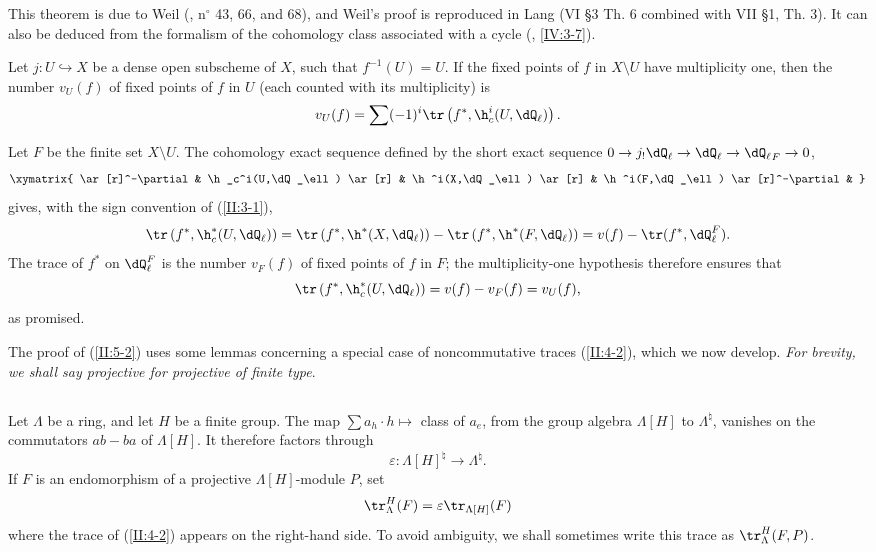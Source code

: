 This theorem is due to Weil (\cite{we48}, n$^\circ$ 43, 66, and 68), and Weil's
proof is reproduced in Lang \cite{la83} (VI \S3 Th. 6 combined with VII \S1,
Th. 3). It can also be deduced from the formalism of the cohomology class
associated with a cycle (, \ref{IV:3-7}).






\begin{corollary_}\label{II:5-4}
Let $j:U\hookrightarrow X$ be a dense open subscheme of $X$, such that
$f^{-1}(U)=U$. If the fixed points of $f$ in $X\setminus U$ have multiplicity
one, then the number $v_U(f)$ of fixed points of $f$ in $U$ (each counted
with its multiplicity) is
\[
  v_U(f) = \sum (-1)^i \tr\left(f^*,\h_c^i(U,\dQ_\ell)\right) \text{.}
\]
\end{corollary_}

Let $F$ be the finite set $X\setminus U$. The cohomology exact sequence
defined by the short exact sequence
$0\to j_! \dQ_\ell\to\dQ_\ell\to{\dQ_\ell}_F\to 0$,
\[\xymatrix{
  \ar[r]^-\partial
    & \h_c^i(U,\dQ_\ell) \ar[r]
    & \h^i(X,\dQ_\ell) \ar[r]
    & \h^i(F,\dQ_\ell) \ar[r]^-\partial
    &
}\]
gives, with the sign convention of (\ref{II:3-1}),
\[
  \tr\left(f^*,\h_c^*(U,\dQ_\ell)\right)
    = \tr\left(f^*,\h^*(X,\dQ_\ell)\right) - \tr\left(f^*,\h^*(F,\dQ_\ell)\right)
    = v(f) - \tr(f^*,\dQ_\ell^F) \text{.}
\]
The trace of $f^*$ on $\dQ_\ell^F$ is the number $v_F(f)$ of fixed points of
$f$ in $F$; the multiplicity-one hypothesis therefore ensures that
\[
  \tr\left(f^*,\h_c^*(U,\dQ_\ell)\right)
    = v(f) - v_F(f) = v_U(f) \text{,}
\]
as promised.

The proof of (\ref{II:5-2}) uses some lemmas concerning a special case of
noncommutative traces (\ref{II:4-2}), which we now develop. \emph{For
brevity, we shall say projective for projective of finite type}.






\subsection{}\label{II:5-5}

Let $\Lambda$ be a ring, and let $H$ be a finite group. The map
$\sum a_h \cdot h\mapsto $ class of $a_e$, from the group algebra
$\Lambda[H]$ to $\Lambda^\natural$, vanishes on the commutators $ab-ba$ of
$\Lambda[H]$. It therefore factors through
\[
  \varepsilon : \Lambda[H]^\natural \to \Lambda^\natural \text{.}
\]
If $F$ is an endomorphism of a projective $\Lambda[H]$-module $P$, set
\[
  \tr_\Lambda^H(F) = \varepsilon \tr_{\Lambda[H]} (F)
\]
where the trace of (\ref{II:4-2}) appears on the right-hand side. To avoid
ambiguity, we shall sometimes write this trace as $\tr_\Lambda^H(F,P)$.






